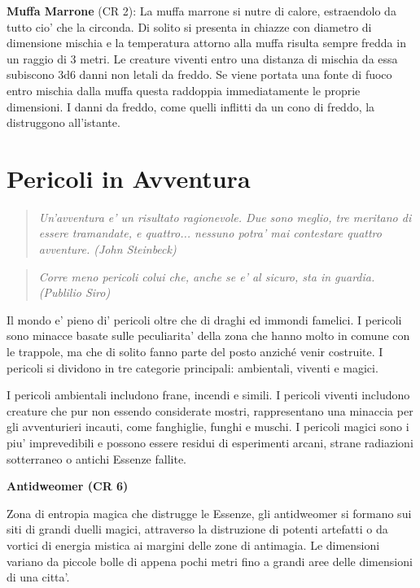 \documentclass[a4paper,11pt,twoside,openany]{book}
\begin{document}
{\textbf{Muffa Marrone} (CR 2): La muffa marrone si nutre di calore, estraendolo da tutto cio' che la circonda. Di solito si presenta in chiazze con diametro di dimensione mischia e la temperatura attorno alla muffa risulta sempre fredda in un raggio di 3 metri. Le creature viventi entro una distanza di mischia da essa subiscono 3d6 danni non letali da freddo. Se viene portata una fonte di fuoco entro mischia dalla muffa questa raddoppia immediatamente le proprie dimensioni. I danni da freddo, come quelli inflitti da un cono di freddo, la distruggono all'istante.

\pagebreak

\section{Pericoli in Avventura}


\begin{quote}\textit{
		{Un'avventura e' un risultato ragionevole. Due sono meglio, tre meritano di essere tramandate, e quattro... nessuno potra' mai contestare quattro avventure. (John Steinbeck)}
}\end{quote}


\label{pericoli-in-avventura}
\begin{quote}\textit{Corre meno pericoli colui che, anche se e' al sicuro, sta in guardia. (Publilio Siro)
}\end{quote}
Il mondo e' pieno di' pericoli oltre che di draghi ed immondi famelici. I pericoli sono minacce basate sulle peculiarita' della zona che hanno molto in comune con le trappole, ma che di solito fanno parte del posto anziché venir costruite. I pericoli si dividono in tre categorie principali: ambientali, viventi e magici.

I pericoli ambientali includono frane, incendi e simili. I pericoli viventi includono creature che pur non essendo considerate mostri, rappresentano una minaccia per gli av­venturieri incauti, come fanghiglie, funghi e muschi. I pericoli magici sono i piu' imprevedibili e possono essere residui di esperimenti arcani, strane radiazioni sotterraneo o antichi Essenze fallite.

\textbf{Antidweomer (CR 6)}

Zona di entropia magica che distrugge le Essenze, gli antidweomer si formano sui siti di grandi duelli magici, attraverso la distruzione di potenti artefatti o da vortici di energia mistica ai margini delle zone di antimagia. Le dimensioni variano da piccole bolle di appena pochi metri fino a grandi aree delle dimensioni di una citta'. 

}
\end{document}
